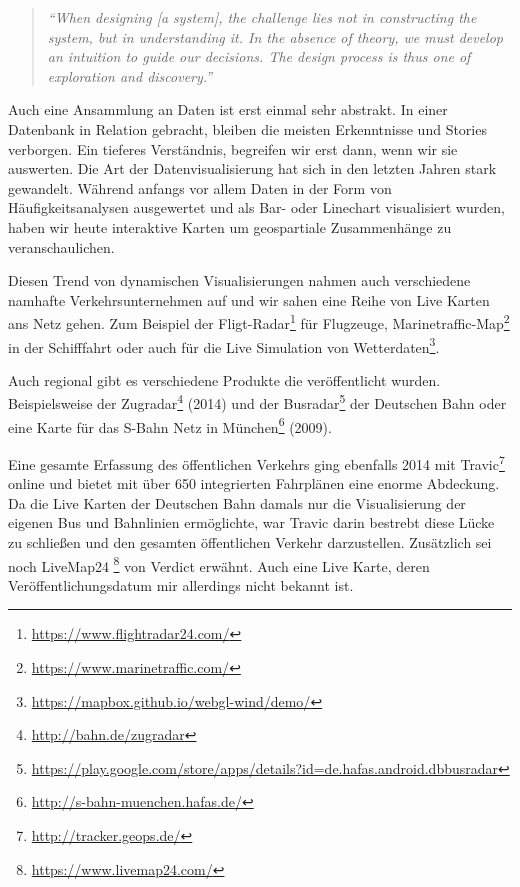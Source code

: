 \begin{newpage}
		\begin{quote}
			\emph{"`When designing [a system], the challenge lies not in constructing the system, but in understanding it. In the absence of theory, we must develop an intuition to guide our decisions. The design process is thus one of exploration and discovery."'} \parencite{victor}
		\end{quote}

		Auch eine Ansammlung an Daten ist erst einmal sehr abstrakt. In einer Datenbank in Relation gebracht, bleiben die meisten Erkenntnisse und Stories verborgen. Ein tieferes Verständnis, begreifen wir erst dann, wenn wir sie auswerten. Die Art der Datenvisualisierung hat sich in den letzten Jahren stark gewandelt. Während anfangs vor allem Daten in der Form von Häufigkeitsanalysen ausgewertet und als Bar- oder Linechart visualisiert wurden, haben wir heute interaktive Karten um geospartiale Zusammenhänge zu veranschaulichen.

		Diesen Trend von dynamischen Visualisierungen nahmen auch verschiedene namhafte Verkehrsunternehmen auf und wir sahen eine Reihe von Live Karten ans Netz gehen. Zum Beispiel der Fligt-Radar\footnote{\url{https://www.flightradar24.com/}} für Flugzeuge, Marinetraffic-Map\footnote{\url{https://www.marinetraffic.com/}} in der Schifffahrt oder auch für die Live Simulation von Wetterdaten\footnote{\url{https://mapbox.github.io/webgl-wind/demo/}}. 

		Auch regional gibt es verschiedene Produkte die veröffentlicht wurden. Beispielsweise der Zugradar\footnote{\url{http://bahn.de/zugradar}} (2014) und der Busradar\footnote{\url{https://play.google.com/store/apps/details?id=de.hafas.android.dbbusradar}} der Deutschen Bahn oder eine Karte für das S-Bahn Netz in München\footnote{\url{http://s-bahn-muenchen.hafas.de/}} (2009).

		Eine gesamte Erfassung des öffentlichen Verkehrs ging ebenfalls 2014 mit Travic\footnote{\url{http://tracker.geops.de/}}\label{travic} online und bietet mit über 650 integrierten Fahrplänen eine enorme Abdeckung. Da die Live Karten der Deutschen Bahn damals nur die Visualisierung der eigenen Bus und Bahnlinien ermöglichte, war Travic darin bestrebt diese Lücke zu schließen und den gesamten öffentlichen Verkehr darzustellen. 
		Zusätzlich sei noch LiveMap24 \footnote{\url{https://www.livemap24.com/}} von Verdict erwähnt. Auch eine Live Karte, deren Veröffentlichungsdatum mir allerdings nicht bekannt ist.


\end{newpage}
